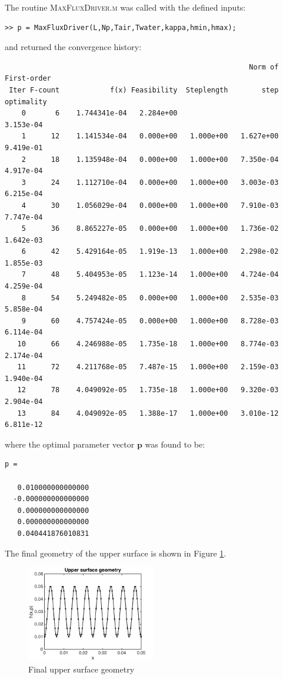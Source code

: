\documentclass[11pt]{article}
\begin{document}
The routine \textsc{MaxFluxDriver.m} was called with the defined
inputs:
\begin{verbatim}
>> p = MaxFluxDriver(L,Np,Tair,Twater,kappa,hmin,hmax);
\end{verbatim}
and returned the convergence history:
\begin{verbatim}
                                                          Norm of First-order
 Iter F-count            f(x) Feasibility  Steplength        step  optimality
    0       6    1.744341e-04   2.284e+00                           3.153e-04
    1      12    1.141534e-04   0.000e+00   1.000e+00   1.627e+00   9.419e-01
    2      18    1.135948e-04   0.000e+00   1.000e+00   7.350e-04   4.917e-04
    3      24    1.112710e-04   0.000e+00   1.000e+00   3.003e-03   6.215e-04
    4      30    1.056029e-04   0.000e+00   1.000e+00   7.910e-03   7.747e-04
    5      36    8.865227e-05   0.000e+00   1.000e+00   1.736e-02   1.642e-03
    6      42    5.429164e-05   1.919e-13   1.000e+00   2.298e-02   1.855e-03
    7      48    5.404953e-05   1.123e-14   1.000e+00   4.724e-04   4.259e-04
    8      54    5.249482e-05   0.000e+00   1.000e+00   2.535e-03   5.858e-04
    9      60    4.757424e-05   0.000e+00   1.000e+00   8.728e-03   6.114e-04
   10      66    4.246988e-05   1.735e-18   1.000e+00   8.774e-03   2.174e-04
   11      72    4.211768e-05   7.487e-15   1.000e+00   2.159e-03   1.940e-04
   12      78    4.049092e-05   1.735e-18   1.000e+00   9.320e-03   2.904e-04
   13      84    4.049092e-05   1.388e-17   1.000e+00   3.010e-12   6.811e-12
\end{verbatim}
where the optimal parameter vector $\boldsymbol{p}$ was found to be:

\newpage

\begin{verbatim}
p =

   0.010000000000000
  -0.000000000000000
   0.000000000000000
   0.000000000000000
   0.040441876010831
\end{verbatim}
The final geometry of the upper surface is shown in Figure
\ref{fig:geometry}.

\begin{figure}[hbt]
\centering
\includegraphics[width=0.5\textwidth]{geometry}
\caption{Final upper surface geometry}
\label{fig:geometry}
\end{figure}
\end{document}
